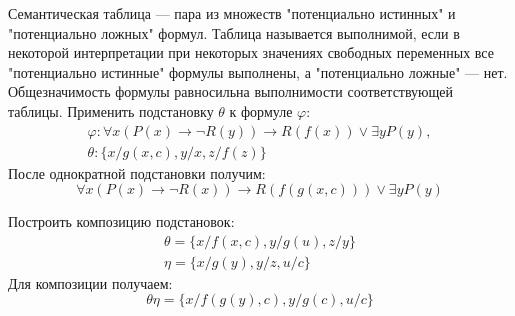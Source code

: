 \documentclass[11pt]{article}
\newcounter{th}\setcounter{th}{0}
\begin{document}
Семантическая таблица --- пара из множеств "потенциально истинных" и "потенциально ложных" формул. Таблица называется выполнимой, если в некоторой интерпретации при некоторых значениях свободных переменных все "потенциально истинные" формулы выполнены, а "потенциально ложные" --- нет. Общезначимость формулы равносильна выполнимости соответствующей таблицы.
Применить подстановку \(\theta\) к формуле \(\varphi\):
\begin{gather*}
\varphi: \forall x (P(x) \to \neg R(y)) \to R(f(x)) \lor \exists y P(y), \\
\theta: \{ x / g(x, c), y / x, z / f(z) \}
\end{gather*}
После однократной подстановки получим:
\begin{equation*}
\forall x (P(x) \to \neg R(x)) \to R(f(g(x, c))) \lor \exists y P(y)
\end{equation*}

Построить композицию подстановок:
\begin{gather*}
\theta = \{x/f(x, c), y/g(u), z/y\} \\
\eta = \{x/g(y), y/z, u/c\}
\end{gather*}
Для композиции получаем:
\begin{equation*}
\theta\eta = \{x/f(g(y), c), y/g(c), u/c\}
\end{equation*}
\end{document}
